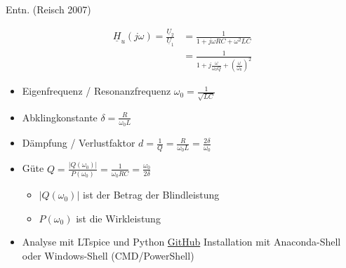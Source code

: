 \documentclass[
  ngerman,
  letterpaper,
]{scrbook}
\newenvironment{Shaded}{}{}
\newcommand{\NormalTok}[1]{\textcolor[rgb]{0.14,0.16,0.18}{#1}}
\providecommand{\tightlist}{%
  \setlength{\itemsep}{0pt}\setlength{\parskip}{0pt}}
\begin{document}
\begin{tcolorbox}[enhanced jigsaw, titlerule=0mm, rightrule=.15mm, toprule=.15mm, colback=white, toptitle=1mm, bottomrule=.15mm, coltitle=black, leftrule=.75mm, arc=.35mm, colbacktitle=quarto-callout-note-color!10!white, opacityback=0, bottomtitle=1mm, colframe=quarto-callout-note-color-frame, opacitybacktitle=0.6, breakable, title=\textcolor{quarto-callout-note-color}{\faInfo}\hspace{0.5em}{Spannungsübertragungsfaktor}, left=2mm]

Entn. (Reisch 2007)

\begin{align}
\underline{H}_u(j \omega) = \frac{\underline{U}_2}{\underline{U}_1} &= \frac{1}{1 + j \omega R C + \omega^2 LC} \\
&= \frac{1}{1 + j \frac{\omega}{\omega_0 Q} + \left(\frac{\omega}{\omega_0}\right)^2}
\end{align}

\begin{itemize}
\item
  Eigenfrequenz / Resonanzfrequenz \(\omega_0 = \frac{1}{\sqrt{L C}}\)
\item
  Abklingkonstante \(\delta = \frac{R}{\omega_0 L}\)
\item
  Dämpfung / Verlustfaktor
  \(d = \frac{1}{Q} = \frac{R}{\omega_0 L} = \frac{2 \delta}{\omega_0}\)
\item
  Güte
  \(Q = \frac{\vert Q(\omega_0) \vert}{P(\omega_0)} = \frac{1}{\omega_0 RC} = \frac{\omega_0}{2 \delta}\)

  \begin{itemize}
  \tightlist
  \item
    \(\vert Q(\omega_0) \vert\) ist der Betrag der Blindleistung
  \item
    \(P(\omega_0)\) ist die Wirkleistung
  \end{itemize}
\item
  Analyse mit LTspice und Python
  \href{https://github.com/DongHoonPark/ltspice_pytool}{GitHub}
  Installation mit Anaconda-Shell oder Windows-Shell (CMD/PowerShell)
\end{itemize}

\begin{Shaded}
\end{Shaded}

\end{tcolorbox}
\end{document}
